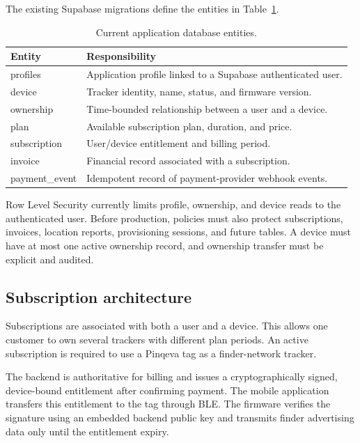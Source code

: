 \documentclass[12pt,a4paper]{article}
\begin{document}
The existing Supabase migrations define the entities in
Table~\ref{tab:database-entities}.

\begin{table}[ht]
    \centering
    \begin{tabularx}{\textwidth}{>{\ttfamily}p{3.2cm}X}
        \toprule
        \normalfont\textbf{Entity} & \textbf{Responsibility} \\
        \midrule
        profiles &
        Application profile linked to a Supabase authenticated user. \\
        device &
        Tracker identity, name, status, and firmware version. \\
        ownership &
        Time-bounded relationship between a user and a device. \\
        plan &
        Available subscription plan, duration, and price. \\
        subscription &
        User/device entitlement and billing period. \\
        invoice &
        Financial record associated with a subscription. \\
        payment\_event &
        Idempotent record of payment-provider webhook events. \\
        \bottomrule
    \end{tabularx}
    \caption{Current application database entities.}
    \label{tab:database-entities}
\end{table}

Row Level Security currently limits profile, ownership, and device reads to the
authenticated user. Before production, policies must also protect
subscriptions, invoices, location reports, provisioning sessions, and future
tables. A device must have at most one active ownership record, and ownership
transfer must be explicit and audited.

\subsection{Subscription architecture}

Subscriptions are associated with both a user and a device. This allows one
customer to own several trackers with different plan periods. An active
subscription is required to use a Pinqeva tag as a finder-network tracker.

The backend is authoritative for billing and issues a cryptographically signed,
device-bound entitlement after confirming payment. The mobile application
transfers this entitlement to the tag through BLE. The firmware verifies the
signature using an embedded backend public key and transmits finder advertising
data only until the entitlement expiry.
\end{document}
